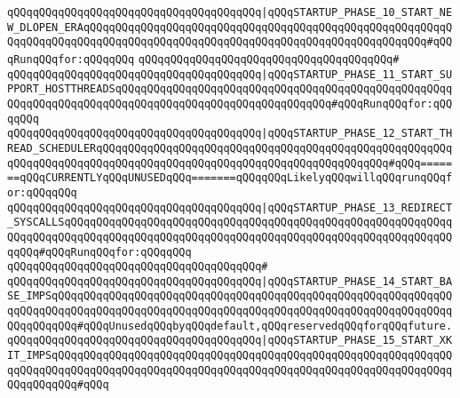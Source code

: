 \verb|qQQqqQQqqQQqqQQqqQQqqQQqqQQqqQQqqQQqqQQq|\verb#|qQQqSTARTUP_PHASE_10_START_NEW_DLOPEN_ERAqQQqqQQqqQQqqQQqqQQqqQQqqQQqqQQqqQQqqQQqqQQqqQQqqQQqqQQqqQQqqQQqqQQqqQQqqQQqqQQqqQQqqQQqqQQqqQQqqQQqqQQqqQQqqQQqqQQqqQQqqQQq#\verb|#qQQqRunqQQqfor:qQQqqQQq|\newline
\verb|qQQqqQQqqQQqqQQqqQQqqQQqqQQqqQQqqQQqqQQq#|\newline
\verb|qQQqqQQqqQQqqQQqqQQqqQQqqQQqqQQqqQQqqQQq|\verb#|qQQqSTARTUP_PHASE_11_START_SUPPORT_HOSTTHREADSqQQqqQQqqQQqqQQqqQQqqQQqqQQqqQQqqQQqqQQqqQQqqQQqqQQqqQQqqQQqqQQqqQQqqQQqqQQqqQQqqQQqqQQqqQQqqQQqqQQqqQQq#\verb|#qQQqRunqQQqfor:qQQqqQQq|\newline
\verb|qQQqqQQqqQQqqQQqqQQqqQQqqQQqqQQqqQQqqQQq|\verb#|qQQqSTARTUP_PHASE_12_START_THREAD_SCHEDULERqQQqqQQqqQQqqQQqqQQqqQQqqQQqqQQqqQQqqQQqqQQqqQQqqQQqqQQqqQQqqQQqqQQqqQQqqQQqqQQqqQQqqQQqqQQqqQQqqQQqqQQqqQQqqQQqqQQq#\verb|#qQQq=======qQQqCURRENTLYqQQqUNUSEDqQQq=======qQQqqQQqLikelyqQQqwillqQQqrunqQQqfor:qQQqqQQq|\newline
\verb|qQQqqQQqqQQqqQQqqQQqqQQqqQQqqQQqqQQqqQQq|\verb#|qQQqSTARTUP_PHASE_13_REDIRECT_SYSCALLSqQQqqQQqqQQqqQQqqQQqqQQqqQQqqQQqqQQqqQQqqQQqqQQqqQQqqQQqqQQqqQQqqQQqqQQqqQQqqQQqqQQqqQQqqQQqqQQqqQQqqQQqqQQqqQQqqQQqqQQqqQQqqQQqqQQqqQQq#\verb|#qQQqRunqQQqfor:qQQqqQQq|\newline
\verb|qQQqqQQqqQQqqQQqqQQqqQQqqQQqqQQqqQQqqQQq#|\newline
\verb|qQQqqQQqqQQqqQQqqQQqqQQqqQQqqQQqqQQqqQQq|\verb#|qQQqSTARTUP_PHASE_14_START_BASE_IMPSqQQqqQQqqQQqqQQqqQQqqQQqqQQqqQQqqQQqqQQqqQQqqQQqqQQqqQQqqQQqqQQqqQQqqQQqqQQqqQQqqQQqqQQqqQQqqQQqqQQqqQQqqQQqqQQqqQQqqQQqqQQqqQQqqQQqqQQqqQQqqQQq#\verb|#qQQqUnusedqQQqbyqQQqdefault,qQQqreservedqQQqforqQQqfuture.|\newline
\verb|qQQqqQQqqQQqqQQqqQQqqQQqqQQqqQQqqQQqqQQq|\verb#|qQQqSTARTUP_PHASE_15_START_XKIT_IMPSqQQqqQQqqQQqqQQqqQQqqQQqqQQqqQQqqQQqqQQqqQQqqQQqqQQqqQQqqQQqqQQqqQQqqQQqqQQqqQQqqQQqqQQqqQQqqQQqqQQqqQQqqQQqqQQqqQQqqQQqqQQqqQQqqQQqqQQqqQQqqQQq#\verb|#qQQq|\newline
